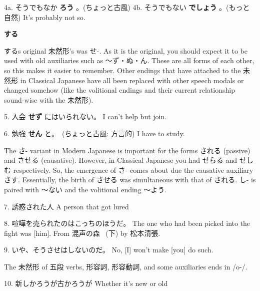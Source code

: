 \par{4a. そうでもなか \textbf{ろう }。(ちょっと古風) \hfill\break
4b. そうでもない \textbf{でしょう }。(もっと自然) \hfill\break
It's probably not so. }

\begin{center}
 \textbf{する }
\end{center}

\par{ する\textquotesingle s original 未然形's was せ-. As it is the original, you should expect it to be used with old auxiliaries such as ～ず・ぬ・ん. These are all forms of each other, so this makes it easier to remember. Other endings that have attached to the 未然形 in Classical Japanese have all been replaced with other speech modals or changed somehow (like the volitional endings and their current relationship sound-wise with the 未然形). }

\par{5. 入会 \textbf{せず }にはいられない。 \hfill\break
I can't help but join. }

\par{6. 勉強 \textbf{せん }と。　(ちょっと古風: 方言的) \hfill\break
I have to study. }

\par{ The さ- variant in Modern Japanese is important for the forms される (passive) and させる (causative). However, in Classical Japanese you had せらる and せしむ respectively. So, the emergence of さ- comes about due the causative auxiliary さす. Essentially, the birth of させる was simultaneous with that of される. し- is paired with ～ない and the volitional ending ～よう. }

\par{7. 誘惑された人 \hfill\break
A person that got lured }

\par{8. 喧嘩を売られたのはこっちのほうだ。 \hfill\break
The one who had been picked into the fight was [him]. \hfill\break
From 混声の森  (下) by 松本清張. }

\par{9. いや、そうさせはしないのだ。 \hfill\break
No, [I] won't make [you] do such. }

\par{ The 未然形 of 五段 verbs, 形容詞, 形容動詞, and some auxiliaries ends in \slash o-\slash . }

\par{10. 新しかろうが古かろうが \hfill\break
Whether it's new or old }

